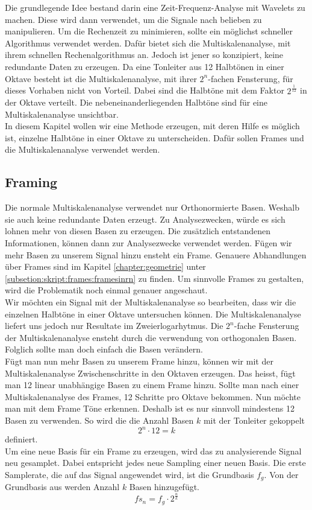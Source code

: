 



Die grundlegende Idee bestand darin eine Zeit-Frequenz-Analyse mit Wavelets zu machen. Diese wird dann verwendet, um die Signale nach belieben zu manipulieren. Um die Rechenzeit zu minimieren, sollte ein möglichst schneller Algorithmus verwendet werden. Dafür bietet sich die Multiskalenanalyse, mit ihrem schnellen Rechenalgorithmus an. Jedoch ist jener so konzipiert, keine redundante Daten zu erzeugen. Da eine Tonleiter aus 12 Halbtönen in einer Oktave besteht ist die Multiskalenanalyse, mit ihrer $2^{n}$-fachen Fensterung, für dieses Vorhaben nicht von Vorteil. Dabei sind die Halbtöne mit dem Faktor $2^{\frac{1}{12}}$ in der Oktave verteilt. Die nebeneinanderliegenden Halbtöne sind für eine Multiskalenanalyse unsichtbar. \\
In diesem Kapitel wollen wir eine Methode erzeugen, mit deren Hilfe es möglich ist, einzelne Halbtöne in einer Oktave zu unterscheiden. Dafür sollen Frames und die Multiskalenanalyse verwendet werden.




\subsection{Framing}

Die normale Multiskalenanalyse verwendet nur Orthonormierte Basen. Weshalb sie auch keine redundante Daten erzeugt. Zu Analysezwecken, würde es sich lohnen mehr von diesen Basen zu erzeugen. Die zusätzlich entstandenen Informationen, können dann zur Analysezwecke verwendet werden. Fügen wir mehr Basen zu unserem Signal hinzu ensteht ein Frame. Genauere Abhandlungen über Frames sind im Kapitel \ref{chapter:geometrie} unter \ref{subsetion:skript:frames:framesinrn} zu finden. Um sinnvolle Frames zu gestalten, wird die Problematik noch einmal genauer angeschaut.\\

Wir möchten ein Signal mit der Multiskalenanalyse so bearbeiten, dass wir die einzelnen Halbtöne in einer Oktave untersuchen können. Die Multiskalenanalyse liefert uns jedoch nur Resultate im Zweierlogarhytmus. Die $2^{n}$-fache Fensterung der Multiskalenanalyse ensteht durch die verwendung von orthogonalen Basen. Folglich sollte man doch einfach die Basen verändern.\\

Fügt man nun mehr Basen zu unserem Frame hinzu, können wir mit der Multiskalenanalyse Zwischenschritte in den Oktaven erzeugen. Das heisst, fügt man 12 linear unabhängige Basen zu einem Frame hinzu. Sollte man nach einer Multiskalenanalyse des Frames, 12 Schritte pro Oktave bekommen. Nun möchte man mit dem Frame Töne erkennen. Deshalb ist es nur sinnvoll mindestens 12 Basen zu verwenden. So wird die die Anzahl Basen $k$ mit der Tonleiter gekoppelt
\[ 2^{n} \cdot 12 = k \]
definiert.\\
Um eine neue Basis für ein Frame zu erzeugen, wird das zu analysierende Signal neu gesamplet. Dabei entspricht jedes neue Sampling einer neuen Basis. Die erste Samplerate, die auf das Signal angewendet wird, ist die Grundbasis $f_{g}$. Von der Grundbasis aus werden Anzahl $k$ Basen hinzugefügt.
\[fs_{n}=f_{g}\cdot2^{\frac{n}{k}}\]

